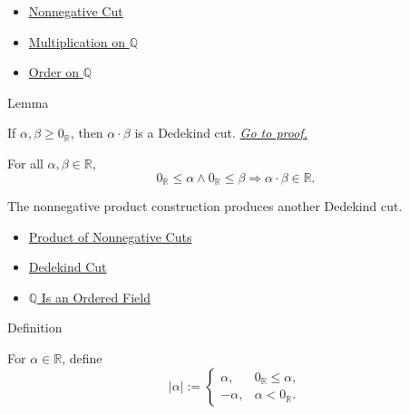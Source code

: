 \begin{dependencies}
\begin{itemize}
  \item \hyperref[def:nonnegative-cut]{Nonnegative Cut}
  \item \hyperref[def:multiplication-on-q-classes]{Multiplication on $\mathbb{Q}$}
  \item \hyperref[def:order-on-q]{Order on $\mathbb{Q}$}
\end{itemize}
\end{dependencies}

\begin{lemmabox}{Lemma}
\begin{lemma}
\label{lem:product-nonnegative-is-a-cut}
If $\alpha,\beta\ge 0_{\mathbb{R}}$, then $\alpha\cdot\beta$ is a Dedekind cut.
\hyperref[prf:product-nonnegative-is-a-cut]{\textit{Go to proof.}}
\end{lemma}
\end{lemmabox}

\begin{remark*}
For all $\alpha,\beta\in\mathbb{R}$,
\[
0_{\mathbb{R}}\le\alpha\land 0_{\mathbb{R}}\le\beta
\Longrightarrow
\alpha\cdot\beta\in\mathbb{R}.
\]
\end{remark*}

\begin{remark*}[Interpretation]
The nonnegative product construction produces another Dedekind cut.
\end{remark*}

\begin{dependencies}
\begin{itemize}
  \item \hyperref[def:product-nonnegative-on-r]{Product of Nonnegative Cuts}
  \item \hyperref[def:dedekind-cut]{Dedekind Cut}
  \item \hyperref[thm:q-is-an-ordered-field]{$\mathbb{Q}$ Is an Ordered Field}
\end{itemize}
\end{dependencies}

\begin{definitionbox}{Definition}
\begin{definition}
\label{def:real-chapter-absolute-value-on-r}
For $\alpha\in\mathbb{R}$, define
\[
|\alpha|:=
\begin{cases}
\alpha, & 0_{\mathbb{R}}\le\alpha,\\
-\alpha, & \alpha<0_{\mathbb{R}}.
\end{cases}
\]
\end{definition}
\end{definitionbox}

